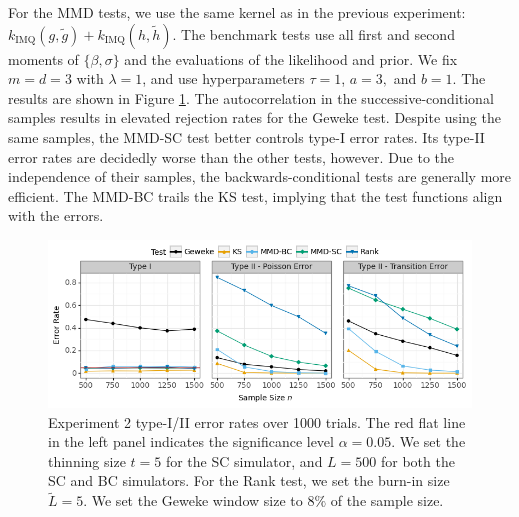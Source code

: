 \documentclass{article}
\begin{document}
For the MMD tests, we use the same kernel as in the previous experiment: $k_{\mathrm{IMQ}}(g, \tilde{g}) + k_{\mathrm{IMQ}}(h, \tilde{h})$. The benchmark tests use all first and second moments of $\{\beta,\sigma\}$ and the evaluations of the likelihood and prior.
We fix $m=d=3$ with $\lambda=1$, and use hyperparameters $\tau=1$, $a=3,$ and $b=1$. 
The results are shown in Figure \ref{fig:ex2_comparison}. The autocorrelation in the successive-conditional samples results in elevated rejection rates for the Geweke test. Despite using the same samples, the MMD-SC test better controls type-I error rates. Its type-II error rates are decidedly worse than the other tests, however. Due to the independence of their samples, the backwards-conditional tests are generally more efficient. The MMD-BC trails the KS test, implying that the test functions align with the errors.


\begin{figure}
    \centering
    \includegraphics[width=\textwidth]{figures/results_2.png}
    \caption{Experiment 2 type-I/II error rates over 1000 trials. 
    The red flat line in the left panel indicates the significance level $\alpha=0.05$. 
    We set the thinning size $t=5$ for the SC simulator, and $L=500$ for both the SC and BC simulators. For the Rank test, we set the burn-in size $\tilde{L}=5$. We set the Geweke window size to $8\%$ of the sample size.
    }
    \label{fig:ex2_comparison}
\end{figure}
\end{document}
